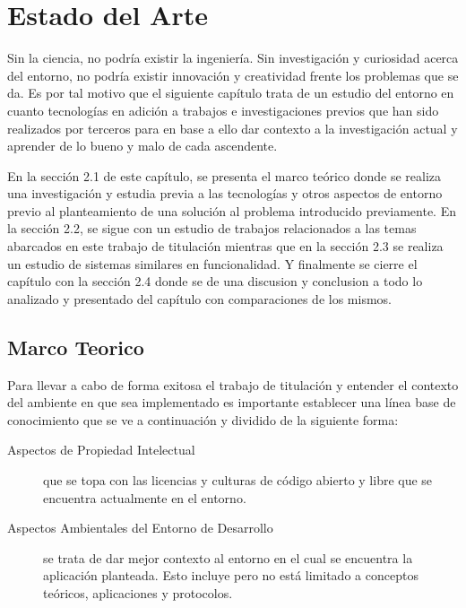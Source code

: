 
\chapter{Estado del Arte}
\label{capitulo2}

Sin la ciencia, no podría existir la ingeniería. Sin investigación y curiosidad acerca del entorno, no podría existir innovación y creatividad frente los problemas que se da. Es por tal motivo que el siguiente capítulo trata de un estudio del entorno en cuanto tecnologías en adición a trabajos e investigaciones previos que han sido realizados por terceros para en base a ello dar contexto a la investigación actual y aprender de lo bueno y malo de cada ascendente.

En la sección 2.1 de este capítulo, se presenta el marco teórico donde se realiza una investigación y estudia previa a las tecnologías y otros aspectos de entorno previo al planteamiento de una solución al problema introducido previamente. En la sección 2.2, se sigue con un estudio de trabajos relacionados a las temas abarcados en este trabajo de titulación mientras que en la sección 2.3 se realiza un estudio de sistemas similares en funcionalidad. Y finalmente se cierre el capítulo con la sección 2.4 donde se de una discusion y conclusion a todo lo analizado y presentado del capítulo con comparaciones de los mismos. 


\section{Marco Teorico}
Para llevar a cabo de forma exitosa el trabajo de titulación y entender el contexto del ambiente en que sea implementado es importante establecer una línea base de conocimiento que se ve a continuación y dividido de la siguiente forma:
\begin{description}
	\item[Aspectos de Propiedad Intelectual] que se topa con las licencias y culturas de código abierto y libre que se encuentra actualmente en el entorno.
    \item[Aspectos Ambientales del Entorno de Desarrollo] se trata de dar mejor contexto al entorno en el cual se encuentra la aplicación planteada. Esto incluye pero no está limitado a conceptos teóricos, aplicaciones y protocolos.
\end{description}

